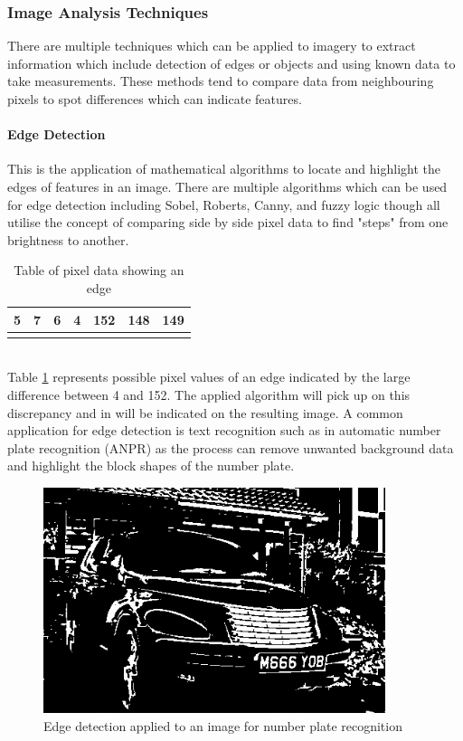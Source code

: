 \subsubsection{Image Analysis Techniques}
	There are multiple techniques which can be applied to imagery to extract information which include detection of edges or objects and using known data to take measurements. These methods tend to compare data from neighbouring pixels to spot differences which can indicate features.
	\paragraph{Edge Detection}
	This is the application of mathematical algorithms to locate and highlight the edges of features in an image. There are multiple algorithms which can be used for edge detection including Sobel, Roberts, Canny, and fuzzy logic though all utilise the concept of comparing side by side pixel data to find "steps" from one brightness to another.
	\begin{table}[h!]
		\centering
		\caption{Table of pixel data showing an edge}
		\label{tab:edgePixels}
		\begin{tabular}{|c|c|c|c|c|c|c|}
			\hline
			5&7&6&4&152&148&149\\
			\hline
			\cellcolor[HTML]{0D0D0D}&
			\cellcolor[HTML]{121212}&
			\cellcolor[HTML]{0F0F0F}&
			\cellcolor[HTML]{0a0a0a}&
			\cellcolor[HTML]{989898}&
			\cellcolor[HTML]{949494}&
			\cellcolor[HTML]{959595}\\
			\hline
		\end{tabular}
	\end{table}\\
	Table \ref{tab:edgePixels} represents possible pixel values of an edge indicated by the large difference between 4 and 152. The applied algorithm will pick up on this discrepancy and in will be indicated on the resulting image. A common application for edge detection is text recognition such as in automatic number plate recognition (ANPR) \citep{anpr} as the process can remove unwanted background data and highlight the block shapes of the number plate.
	\begin{figure}[h!]
		\centering
		\includegraphics[width=10cm]{../images/anpr.jpg}
		\caption{Edge detection applied to an image for number plate recognition}
		\label{fig:anpr}
	\end{figure} 
